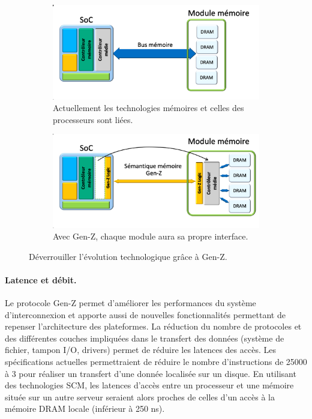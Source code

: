             \begin{figure}[t!]
                \centering
                \begin{subfigure}[t]{0.49\textwidth}
                    \centering
                    \includegraphics[width=\linewidth]{images/edl_genz_current_bus.png}
                    \caption{\label{fig:edl_genz_current_bus} Actuellement les technologies mémoires et celles des processeurs sont liées.}
                \end{subfigure}\hfill
                \begin{subfigure}[t]{0.49\textwidth}
                    \centering
                    \includegraphics[width=\linewidth]{images/edl_genz_new_bus.png}
                    \caption{\label{fig:edl_genz_new_bus} Avec Gen-Z, chaque module aura sa propre interface.}
                \end{subfigure}
                \caption{\label{fig:edl_genz_bus_evo} Déverrouiller l'évolution technologique grâce à Gen-Z.}
            \end{figure}


    \paragraph{Latence et débit.}

        Le protocole Gen-Z permet d'améliorer les performances du système d'interconnexion et apporte aussi de nouvelles fonctionnalités permettant de repenser l'architecture des plateformes. La réduction du nombre de protocoles et des différentes couches impliquées dans le transfert des données (système de fichier, tampon I/O, drivers) permet de réduire les latences des accès. Les spécifications actuelles permettraient de réduire le nombre d'instructions de 25000 à 3 pour réaliser un transfert d'une donnée localisée sur un disque. En utilisant des technologies SCM, les latences d'accès entre un processeur et une mémoire située sur un autre serveur seraient alors proches de celles d'un accès à la mémoire DRAM locale (inférieur à 250 ns).
     
